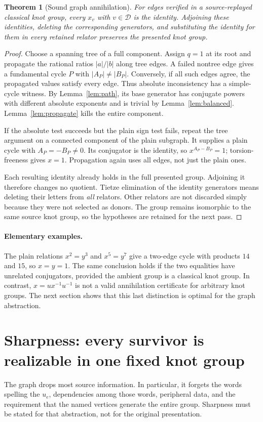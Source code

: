\documentclass[11pt]{article}
\newtheorem{theorem}{Theorem}[section]
\theoremstyle{definition}\newtheorem{definition}[theorem]{Definition}
\theoremstyle{remark}\newtheorem{remark}[theorem]{Remark}
\newcommand{\dead}{\mathcal D}
\begin{document}
\begin{theorem}[Sound graph annihilation]\label{thm:sound}
For edges verified in a source-replayed classical knot group, every
$x_v$ with $v\in\dead$ is the identity. Adjoining these identities,
deleting the corresponding generators, and substituting the identity for
them in every retained relator preserves the presented knot group.
\end{theorem}
\begin{proof}
Choose a spanning tree of a full component. Assign $q=1$ at its root and
propagate the rational ratios $|a|/|b|$ along tree edges. A failed nontree
edge gives a fundamental cycle $P$ with $|A_P|\ne|B_P|$. Conversely, if
all such edges agree, the propagated values satisfy every edge. Thus
absolute inconsistency has a simple-cycle witness. By
Lemma~\ref{lem:path}, its base generator has conjugate powers with
different absolute exponents and is trivial by Lemma~\ref{lem:balanced}.
Lemma~\ref{lem:propagate} kills the entire component.

If the absolute test succeeds but the plain sign test fails, repeat the
tree argument on a connected component of the plain subgraph. It supplies
a plain cycle with $A_P=-B_P\ne0$. Its conjugator is the identity, so
$x^{A_P-B_P}=1$; torsion-freeness gives $x=1$. Propagation again uses
all edges, not just the plain ones.

Each resulting identity already holds in the full presented group.
Adjoining it therefore changes no quotient. Tietze elimination of the
identity generators means deleting their letters from \emph{all} relators.
Other relators are not discarded simply because they were not selected as
donors. The group remains isomorphic to the same source knot group, so the
hypotheses are retained for the next pass.
\end{proof}

\paragraph{Elementary examples.}
The plain relations $x^2=y^3$ and $x^5=y^7$ give a two-edge cycle with
products $14$ and $15$, so $x=y=1$. The same conclusion holds if the two
equalities have unrelated conjugators, provided the ambient group is a
classical knot group. In contrast, $x=u x^{-1}u^{-1}$ is not a valid
annihilation certificate for arbitrary knot groups. The next section
shows that this last distinction is optimal for the graph abstraction.

\section{Sharpness: every survivor is realizable in one fixed knot group}
\label{sec:sharp}
The graph drops most source information. In particular, it forgets the
words spelling the $u_e$, dependencies among those words, peripheral data,
and the requirement that the named vertices generate the entire group.
Sharpness must be stated for that abstraction, not for the original
presentation.
\end{document}

